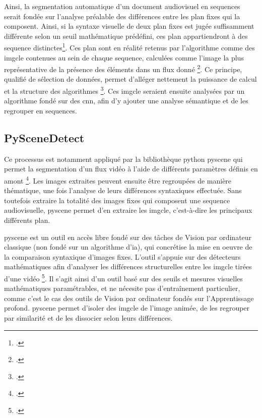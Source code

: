Ainsi, la segmentation automatique d'un document audiovisuel en \gls{sequence}s serait fondée sur l'analyse préalable des différences entre les \gls{plan} fixes qui la composent. Ainsi, si la syntaxe visuelle de deux \gls{plan} fixes est jugée suffisamment différente selon un seuil mathématique prédéfini, ces \gls{plan} appartiendront à des \gls{sequence} distinctes\footcite{xin2023}. Ces \gls{plan} sont en réalité retenus par l'algorithme comme des \gls{imgcle} contenues au sein de chaque \gls{sequence}, calculées comme l'image la plus représentative de la présence des éléments dans un flux donné \footcite{xin2023}. Ce principe, qualifié de sélection de données, permet d'alléger nettement la puissance de calcul et la structure des algorithmes \footcite{xin2023}. Ces \gls{imgcle} seraient ensuite analysées par un algorithme fondé sur des \gls{cnn}, afin d'y ajouter une analyse sémantique et de les regrouper en \gls{sequence}s. 

\subsection{PySceneDetect}

Ce processus est notamment appliqué par la bibliothèque python \gls{pyscene} qui permet la segmentation d'un flux vidéo à l'aide de différents paramètres définis en amont \footcite{zotero-item-706}. Les images extraites peuvent ensuite être regroupées de manière thématique, une fois l'analyse de leurs différences syntaxiques effectuée. Sans toutefois extraire la totalité des images fixes qui composent une \gls{sequence} audiovisuelle, \gls{pyscene} permet d'en extraire les \gls{imgcle}, c'est-à-dire les principaux différents \gls{plan}.

\gls{pyscene} est un outil en accès libre fondé sur des tâches de \gls{Vision par ordinateur} classique (non fondé sur un algorithme d'\gls{ia}), qui concrétise la mise en oeuvre de la comparaison syntaxique d'images fixes. L'outil s'appuie sur des détecteurs mathématiques afin d'analyser les différences structurelles entre les \gls{imgcle} tirées d'une vidéo \footcite{zotero-item-708}. Il s’agit ainsi d’un outil basé sur des seuils et mesures visuelles mathématiques paramétrables, et ne nécesite pas d'entraînement particulier, comme c'est le cas des outils de \gls{Vision par ordinateur} fondés sur l'\gls{Apprentissage profond}. \gls{pyscene} permet d'isoler des \gls{imgcle} de l'image animée, de les regrouper par similarité et de les dissocier selon leurs différences. 

